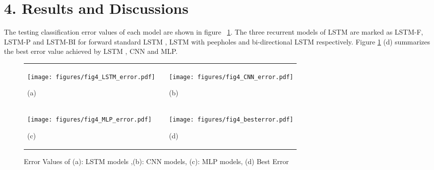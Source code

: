\documentclass[12pt,a4paper]{article}
\begin{document}
\section*{4. Results and Discussions}
The testing classification error values of each model are shown in figure ~\ref{error}. The three recurrent models of LSTM are marked as LSTM-F, LSTM-P and LSTM-BI for forward standard LSTM , LSTM with peepholes and bi-directional LSTM respectively. Figure \ref{error} (d) summarizes the best error value achieved by LSTM , CNN and MLP.

\begin{figure}[h!]
 \centering
\begin{tabular}{ p{6cm} p{1cm} p{6cm} }
\texttt{[image: figures/fig4\_LSTM\_error.pdf]}{\begin{center}(a)\end{center} }& & \texttt{[image: figures/fig4\_CNN\_error.pdf]}{\begin{center}(b) \end{center} }\\
\texttt{[image: figures/fig4\_MLP\_error.pdf]}{\begin{center}(c) \end{center} }& &
\texttt{[image: figures/fig4\_besterror.pdf]}{\begin{center}(d) \end{center} }\\
\end{tabular}
\caption{Error Values of (a): LSTM models ,(b): CNN models, (c): MLP models, (d) Best Error}
\label{error}
\end{figure}
\end{document}
